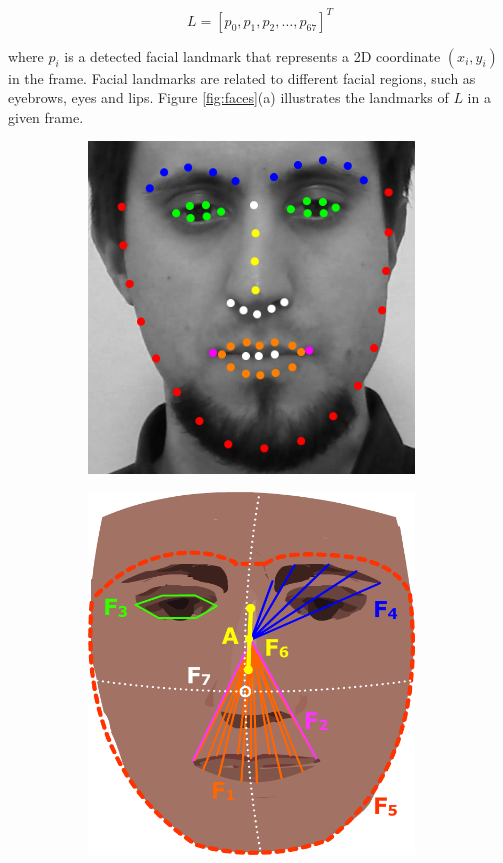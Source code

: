 \[
L = [p_0, p_1, p_2, \dots, p_{67}]^T
\]

where $p_i$ is a detected facial landmark that represents a 2D coordinate $(x_i, y_i)$ in the frame. Facial landmarks are related to different facial regions, such as eyebrows, eyes and lips. Figure \ref{fig:faces}(a) illustrates the landmarks of $L$ in a given frame.

\begin{figure}
\centering
  \begin{subfigure}[b]{0.5\textwidth}
    \includegraphics[width=0.95\textwidth]{Content/figures/facial-landmarks-detail.png}
    \caption{}
    \label{fig:facial-landmarks}
  \end{subfigure}%
  \begin{subfigure}[b]{0.5\textwidth}
    \centering
    \includegraphics[width=0.95\textwidth]{Content/figures/facial-features.png}

\end{subfigure}
\end{figure}
